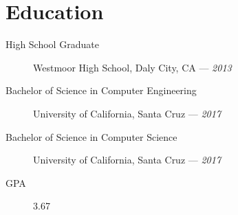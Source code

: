 \documentclass[10pt]{article}
\author{August Valera}
\begin{document}

\section*{Education}
\begin{description}
  \item[High School Graduate] Westmoor High School, Daly City, CA ---
    \textit{2013}
  \item[Bachelor of Science in Computer Engineering] University of California,
    Santa Cruz --- \textit{2017}
  \item[Bachelor of Science in Computer Science] University of California,
    Santa Cruz --- \textit{2017}
  \item[GPA] 3.67
\end{description}
\end{document}
